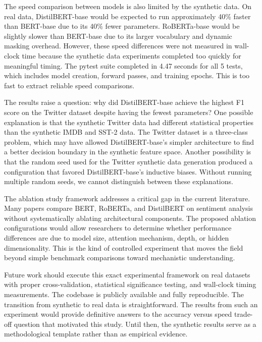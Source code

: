 \documentclass[conference]{IEEEtran}
\begin{document}
The speed comparison between models is also limited by the synthetic data. On real data, DistilBERT-base would be expected to run approximately 40\% faster than BERT-base due to its 40\% fewer parameters. RoBERTa-base would be slightly slower than BERT-base due to its larger vocabulary and dynamic masking overhead. However, these speed differences were not measured in wall-clock time because the synthetic data experiments completed too quickly for meaningful timing. The pytest suite completed in 4.47 seconds for all 5 tests, which includes model creation, forward passes, and training epochs. This is too fast to extract reliable speed comparisons.

The results raise a question: why did DistilBERT-base achieve the highest F1 score on the Twitter dataset despite having the fewest parameters? One possible explanation is that the synthetic Twitter data had different statistical properties than the synthetic IMDB and SST-2 data. The Twitter dataset is a three-class problem, which may have allowed DistilBERT-base's simpler architecture to find a better decision boundary in the synthetic feature space. Another possibility is that the random seed used for the Twitter synthetic data generation produced a configuration that favored DistilBERT-base's inductive biases. Without running multiple random seeds, we cannot distinguish between these explanations.

The ablation study framework addresses a critical gap in the current literature. Many papers compare BERT, RoBERTa, and DistilBERT on sentiment analysis without systematically ablating architectural components. The proposed ablation configurations would allow researchers to determine whether performance differences are due to model size, attention mechanism, depth, or hidden dimensionality. This is the kind of controlled experiment that moves the field beyond simple benchmark comparisons toward mechanistic understanding.

Future work should execute this exact experimental framework on real datasets with proper cross-validation, statistical significance testing, and wall-clock timing measurements. The codebase is publicly available and fully reproducible. The transition from synthetic to real data is straightforward. The results from such an experiment would provide definitive answers to the accuracy versus speed trade-off question that motivated this study. Until then, the synthetic results serve as a methodological template rather than as empirical evidence.
\end{document}
